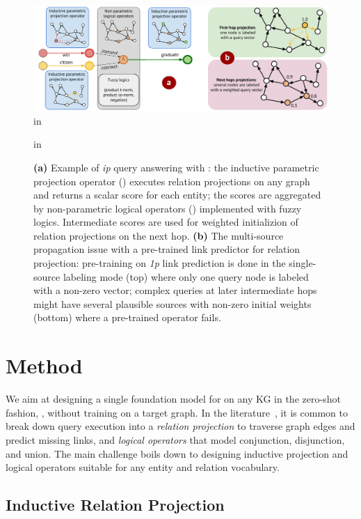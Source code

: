 \begin{figure}[t]
    \centering
    \includegraphics[width=\linewidth]{figs/Fig2v2.pdf}
     in
    \caption{\textbf{(a)} Example of \emph{ip} query answering with \method: the inductive parametric projection operator () executes relation projections on any graph and returns a scalar score for each entity; the scores are aggregated by non-parametric logical operators () implemented with fuzzy logics. Intermediate scores are used for weighted initializion of relation projections on the next hop. \textbf{(b)} The multi-source propagation issue with a pre-trained link predictor for relation projection: pre-training on  \emph{1p} link prediction is done in the single-source labeling mode (top) where only one query node is labeled with a non-zero vector; complex queries at later intermediate hops might have several plausible sources with non-zero initial weights %
    (bottom) where a pre-trained operator fails. }
    \label{fig:ultraquery}
     in
\end{figure}

\section{Method}
\label{sec:method}

We aim at designing a single foundation model for \clqa on any KG in the zero-shot fashion, \ie, without training on a target graph.
In the \clqa literature~\citep{gqe,q2b,betae,cqd,gnn_qe}, it is common to break down query execution into a \emph{relation projection} to traverse graph edges and predict missing links, and \emph{logical operators} that model conjunction, disjunction, and union.
The main challenge boils down to designing inductive projection and logical operators suitable for any %
entity and relation vocabulary.

\subsection{Inductive Relation Projection}
\label{subsec:ultra_proj}

